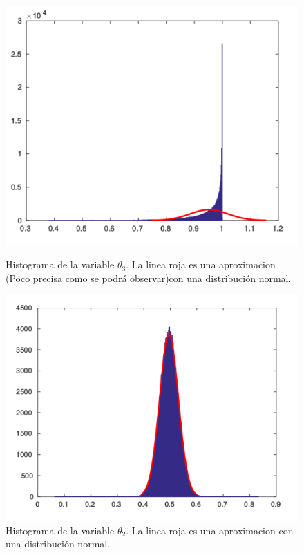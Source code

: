 \begin{figure}[H]
\begin{minipage}{0.45\textwidth}
 \centering
\includegraphics[width=1.0\textwidth]{imgs/theta3.pdf}
	\caption{\footnotesize Histograma de la variable $\theta_3$. La linea roja es una aproximacion (Poco precisa como se podrá observar)con una distribución normal.}
\end{minipage}
\hspace{0.1\textwidth}
\begin{minipage}{0.45\textwidth}
 \centering
\includegraphics[width=1.0\textwidth]{imgs/theta2.pdf}
	\caption{\footnotesize Histograma de la variable $\theta_2$. La linea roja es una aproximacion con una distribución normal.}
\end{minipage}
\end{figure}

